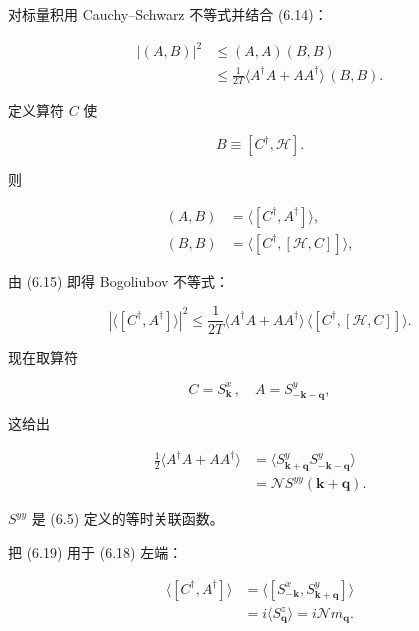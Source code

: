 对标量积用 Cauchy--Schwarz 不等式并结合 (6.14)：

\begin{align*}
\left| ( A, B ) \right| ^ {2} & \leq ( A, A ) ( B, B )\\
& \leq \frac {1}{2 T} \langle A ^ {\dagger} A + A A ^ {\dagger} \rangle \, ( B, B ).
\tag{6.15}
\end{align*}

定义算符 $C$ 使

\begin{equation*}
B \equiv [ C ^ {\dagger}, \mathcal {H} ].
\tag{6.16}
\end{equation*}

则

\begin{align*}
( A, B ) & = \langle [ C ^ {\dagger}, A ^ {\dagger} ] \rangle ,\\
( B, B ) & = \langle [ C ^ {\dagger}, [ \mathcal {H}, C ] ] \rangle ,
\tag{6.17}
\end{align*}

由 (6.15) 即得 Bogoliubov 不等式：

\begin{equation*}
\left| \langle [ C ^ {\dagger}, A ^ {\dagger} ] \rangle \right| ^ {2} \leq \frac {1}{2 T} \langle A ^ {\dagger} A + A A ^ {\dagger} \rangle \, \langle [ C ^ {\dagger}, [ \mathcal {H}, C ] ] \rangle .
\tag{6.18}
\end{equation*}

现在取算符

\begin{equation*}
C = S _ {\mathbf {k}} ^ {x} \, , \quad A = S _ {- \mathbf {k} - \mathbf {q}} ^ {y} ,
\tag{6.19}
\end{equation*}

这给出

\begin{align*}
\frac {1}{2} \langle A ^ {\dagger} A + A A ^ {\dagger} \rangle & = \langle S _ {\mathbf {k} + \mathbf {q}} ^ {y} S _ {- \mathbf {k} - \mathbf {q}} ^ {y} \rangle\\
& = \mathcal {N} S ^ {yy} ( \mathbf {k} + \mathbf {q} ) .
\tag{6.20}
\end{align*}

$S^{yy}$ 是 (6.5) 定义的等时关联函数。

把 (6.19) 用于 (6.18) 左端：

\begin{align*}
\langle [ C ^ {\dagger}, A ^ {\dagger} ] \rangle & = \langle [ S _ {- \mathbf {k}} ^ {x}, S _ {\mathbf {k} + \mathbf {q}} ^ {y} ] \rangle\\
& = i \langle S _ {\mathbf {q}} ^ {z} \rangle = i \mathcal {N} m _ {\mathbf {q}} .
\tag{6.21}
\end{align*}

